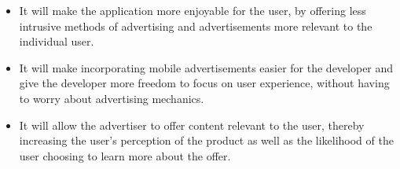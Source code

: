 \begin{abstracts}
\begin{itemize}
  \item It will make the application more enjoyable for the user, by offering less intrusive methods of advertising and advertisements more relevant to the individual user.
  \item It will make incorporating mobile advertisements easier for the developer and give the developer more freedom to focus on user experience, without having to worry about advertising mechanics.
  \item It will allow the advertiser to offer content relevant to the user, thereby increasing the user's perception of the product as well as the likelihood of the user choosing to learn more about the offer.
\end{itemize}

\end{abstracts}


